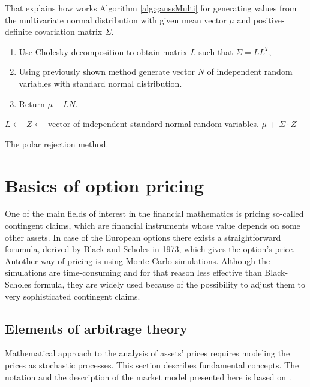 \documentclass[a4paper,11pt, twoside]{book}
\theoremstyle{definition}
\theoremstyle{remark}
\begin{document}
That explains how works Algorithm \ref{alg:gaussMulti} for generating values from the multivariate normal distribution with given mean vector $\mu$ and positive-definite covariation matrix $\Sigma$. 
\begin{enumerate}
 \item Use Cholesky decomposition to obtain matrix $L$ such that $\Sigma = LL^T$,
 \item Using previously shown method generate vector $N$ of independent random variables with standard normal distribution.
 \item Return $\mu + LN$.
\end{enumerate}
\begin{algorithm}[!ht]
 \begin{algorithmic}[1]
    \State $L \gets $ 
    \State $Z \gets $ vector of independent standard normal random variables.
    \State {}
    \State \Return $\mu$ + $\Sigma \cdot Z$
  \EndFunction
 \end{algorithmic}
 \caption{The polar rejection method.}
 \label{alg:gaussMulti}
\end{algorithm}


\chapter{Basics of option pricing}
One of the main fields of interest in the financial mathematics is pricing so-called contingent claims, which are financial instruments whose value depends on some other assets. In case of the European options there exists a straightforward forumula, derived by Black and Scholes in 1973, which gives the option's price. Antother way of pricing is using Monte Carlo simulations.
Although the simulations are time-consuming and for that reason less effective than Black-Scholes formula, they are widely used because of the possibility to adjust them to very sophisticated contingent claims. 

\section{Elements of arbitrage theory}
Mathematical approach to the analysis of assets' prices requires modeling the prices as stochastic processes. This section describes fundamental concepts. The notation and the description of the market model presented here is based on \cite{follmer}.
\end{document}
